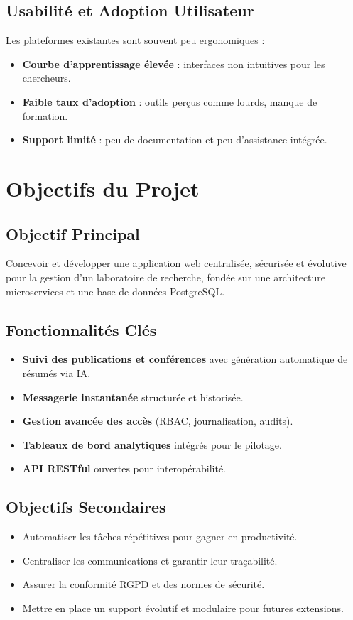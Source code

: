 \documentclass[12pt]{rapportPfe}
\begin{document}
\subsection{Usabilité et Adoption Utilisateur}
Les plateformes existantes sont souvent peu ergonomiques :
\begin{itemize}[itemsep=1em]
  \item \textbf{Courbe d’apprentissage élevée} : interfaces non intuitives pour les chercheurs.
  \item \textbf{Faible taux d’adoption} : outils perçus comme lourds, manque de formation.
  \item \textbf{Support limité} : peu de documentation et peu d’assistance intégrée.
\end{itemize}

\section{Objectifs du Projet}

\subsection{Objectif Principal}
Concevoir et développer une application web centralisée, sécurisée et évolutive pour la gestion d’un laboratoire de recherche, fondée sur une architecture microservices et une base de données PostgreSQL.

\subsection{Fonctionnalités Clés}
\begin{itemize}[itemsep=0.8em]
  \item \textbf{Suivi des publications et conférences} avec génération automatique de résumés via IA.
  \item \textbf{Messagerie instantanée} structurée et historisée.
  \item \textbf{Gestion avancée des accès} (RBAC, journalisation, audits).
  \item \textbf{Tableaux de bord analytiques} intégrés pour le pilotage.
  \item \textbf{API RESTful} ouvertes pour interopérabilité.
\end{itemize}

\subsection{Objectifs Secondaires}
\begin{itemize}[itemsep=0.8em]
  \item Automatiser les tâches répétitives pour gagner en productivité.
  \item Centraliser les communications et garantir leur traçabilité.
  \item Assurer la conformité RGPD et des normes de sécurité.
  \item Mettre en place un support évolutif et modulaire pour futures extensions.
\end{itemize}
\end{document}
